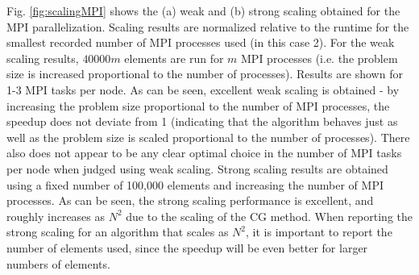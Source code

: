 \documentclass[10pt]{article}
\begin{document}
Fig. \ref{fig:scalingMPI} shows the (a) weak and (b) strong scaling obtained for the MPI parallelization. Scaling results are normalized relative to the runtime for the smallest recorded number of MPI processes used (in this case 2). For the weak scaling results, \(40000m\) elements are run for \(m\) MPI processes (i.e. the problem size is increased proportional to the number of processes). Results are shown for 1-3 MPI tasks per node. As can be seen, excellent weak scaling is obtained - by increasing the problem size proportional to the number of MPI processes, the speedup does not deviate from 1 (indicating that the algorithm behaves just as well as the problem size is scaled proportional to the number of processes). There also does not appear to be any clear optimal choice in the number of MPI tasks per node when judged using weak scaling. Strong scaling results are obtained using a fixed number of 100,000 elements and increasing the number of MPI processes. As can be seen, the strong scaling performance is excellent, and roughly increases as \(N^2\) due to the scaling of the CG method. When reporting the strong scaling for an algorithm that scales as \(N^2\), it is important to report the number of elements used, since the speedup will be even better for larger numbers of elements.
\end{document}
